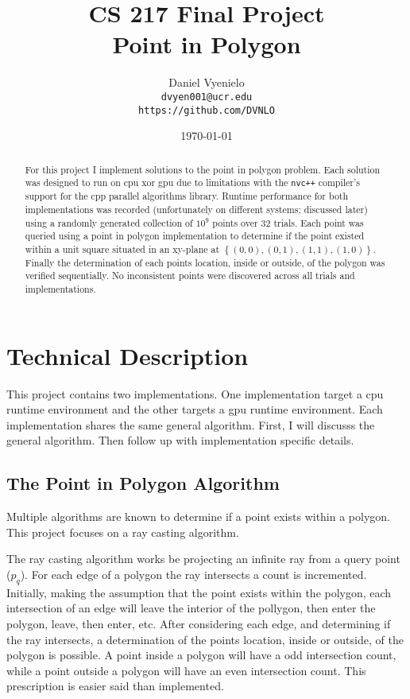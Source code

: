 \documentclass{article}
\begin{document}
\title{CS 217 Final Project \\ Point in Polygon}
\author{Daniel Vyenielo\\
		\texttt{dvyen001@ucr.edu}\\
		\texttt{https://github.com/DVNLO}}
\date{\today}
\maketitle

\begin{abstract}
For this project I implement solutions to the point in polygon problem. Each solution was designed to run on cpu xor gpu due to limitations with the \texttt{nvc++} compiler's support for the cpp parallel algorithms library. Runtime performance for both implementations was recorded (unfortunately on different systems; discussed later) using a randomly generated collection of $10^9$ points over 32 trials. Each point was queried using a point in polygon implementation to determine if the point existed within a unit square situated in an xy-plane at $\left\lbrace (0,0), (0,1), (1,1), (1,0) \right\rbrace$. Finally the determination of each points location, inside or outside, of the polygon was verified sequentially. No inconsistent points were discovered across all trials and implementations.
\end{abstract}

\section{Technical Description}
This project contains two implementations. One implementation target a cpu runtime environment and the other targets a gpu runtime environment. Each implementation shares the same general algorithm. First, I will discusss the general algorithm. Then follow up with implementation specific details.

\subsection{The Point in Polygon Algorithm}
Multiple algorithms are known to determine if a point exists within a polygon. This project focuses on a ray casting algorithm. 

The ray casting algorithm works be projecting an infinite ray from a query point ($p_q$). For each edge of a polygon the ray intersects a count is incremented. Initially, making the assumption that the point exists within the polygon, each intersection of an edge will leave the interior of the pollygon, then enter the polygon, leave, then enter, etc. After considering each edge, and determining if the ray intersects, a determination of the points location, inside or outside, of the polygon is possible. A point inside a polygon will have a odd intersection count, while a point outside a polygon will have an even intersection count. This prescription is easier said than implemented. 
\end{document}

